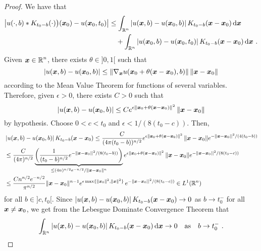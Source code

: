 \begin{proof}
We have that
\begin{equation} \label{heat_unicD}
\begin{split}
\left| u(\cdot, b) \ast K_{t_0-b}(\cdot)\big)({\bm{x}}_0)
- u({\bm{x}}_0,t_0) \right|
&\leq \int_{\mathbb{R}^n} \left|u({\bm{x}},b) - u({\bm{x}}_0,b) \right|
K_{t_0-b}({\bm{x}}-{\bm{x}}_0) \,\mathrm{d}{{\bm{x}}} \\
&\quad + \int_{\mathbb{R}^n} \left|u({\bm{x}}_0,b) - u({\bm{x}}_0,t_0) \right|
K_{t_0-b}({\bm{x}}-{\bm{x}}_0) \,\mathrm{d}{{\bm{x}}} \ .
\end{split}
\end{equation}
Given $\displaystyle {\bm{x}} \in \mathbb{R}^n$, there exists
$\theta \in ]0,1[$ such that 
\[
\left|u({\bm{x}},b) - u({\bm{x}}_0,b) \right|
\leq \| \nabla_{{\bm{x}}} u( {\bm{x}}_0+\theta({\bm{x}}-{\bm{x}}_0),b)\|
\, \|{\bm{x}} - {\bm{x}}_0 \|
\]
according to the Mean Value Theorem for functions of several variables.
Therefore, given $\epsilon>0$, there exists $C>0$ such that
\[
\left|u({\bm{x}},b) - u({\bm{x}}_0,b) \right|
\leq C e^{\epsilon \|{\bm{x}}_0 + \theta ({\bm{x}}-{\bm{x}}_0)\|^2}\,
\|{\bm{x}}-{\bm{x}}_0\|
\]
by hypothesis.  Choose $0 < c < t_0$ and $\epsilon < 1/(8(t_0-c))$.  Then,
\begin{align*}
&\left|u({\bm{x}},b) - u({\bm{x}}_0,b) \right| K_{t_0-b}({\bm{x}}-{\bm{x}}_0)
\leq \frac{C}{(4\pi (t_0-b))^{n/2}}
e^{\epsilon \|{\bm{x}}_0 + \theta ({\bm{x}}-{\bm{x}}_0)\|^2}\, \|{\bm{x}}-{\bm{x}}_0\|
e^{-\|{\bm{x}}-{\bm{x}}_0||^2/(4(t_0-b))} \\
&\leq \frac{C}{(4\pi)^{n/2}}
\underbrace{\left(\frac{1}{(t_0-b)^{n/2}} e^{-\|{\bm{x}}-{\bm{x}}_0||^2/(8(t_0-b))}
\right)}_{\leq (4n)^{n/2} e^{-n/2} /\|{\bm{x}}-{\bm{x}}_0\|^n}
e^{\epsilon \|{\bm{x}}_0 + \theta ({\bm{x}}-{\bm{x}}_0)\|^2}\, \|{\bm{x}}-{\bm{x}}_0\|
e^{-\|{\bm{x}}-{\bm{x}}_0||^2/(8(t_0-c))} \\
&\leq \frac{C n^{n/2} e^{-n/2}}{\pi^{n/2}}
\|{\bm{x}}-{\bm{x}}_0\|^{n-1} e^{\epsilon \max \{\|{\bm{x}}_0\|^2,\|{\bm{x}}\|^2\}}\,
e^{-\|{\bm{x}}-{\bm{x}}_0||^2/(8(t_0-c))}  \in L^1(\mathbb{R}^n)
\end{align*}
for all $b \in ]c,t_0[$.  Since
$\displaystyle
\left|u({\bm{x}},b) - u({\bm{x}}_0,b) \right| K_{t_0-b}({\bm{x}}-{\bm{x}}_0)
\to 0$ as $b\to t_0^-$ for all ${\bm{x}} \neq {\bm{x}}_0$, we get from
the Lebesgue Dominate Convergence Theorem that
\begin{equation} \label{heat_unicE}
\int_{\mathbb{R}^n} \left|u({\bm{x}},b) - u({\bm{x}}_0,b) \right|
K_{t_0-b}({\bm{x}}-{\bm{x}}_0) \,\mathrm{d}{{\bm{x}}} \to 0
\quad \text{as} \quad b \to t_0^- \ .
\end{equation}


\end{proof}
